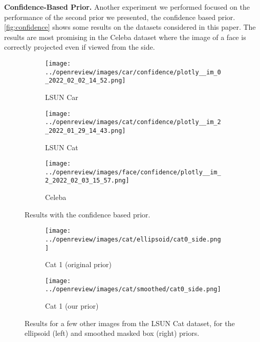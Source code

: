 \textbf{Confidence-Based Prior.}
Another experiment we performed focused on the performance of the second prior we presented, the confidence based prior. \autoref{fig:confidence} shows some results on the datasets considered in this paper. The results are most promising in the Celeba dataset where the image of a face is correctly projected even if viewed from the side.
\begin{figure}[!htb]
    \centering
    \begin{subfigure}{0.32\textwidth}
        \centering
        \texttt{[image: ../openreview/images/car/confidence/plotly\_\_im\_0\_2022\_02\_02\_14\_52.png]}
        \caption{LSUN Car}
        
    \end{subfigure}
    \begin{subfigure}{0.32\textwidth}
        \centering
        \texttt{[image: ../openreview/images/cat/confidence/plotly\_\_im\_2\_2022\_01\_29\_14\_43.png]}
        \caption{LSUN Cat}
        
    \end{subfigure}
    \begin{subfigure}{0.32\textwidth}
        \centering
        \texttt{[image: ../openreview/images/face/confidence/plotly\_\_im\_2\_2022\_02\_03\_15\_57.png]}
        \caption{Celeba}
        
    \end{subfigure}
    \caption{Results with the confidence based prior.}
    \label{fig:confidence}
\end{figure}

\begin{figure}[!htb]
    \centering
    \begin{subfigure}{0.4\textwidth}
        \centering
        \texttt{[image: ../openreview/images/cat/ellipsoid/cat0\_side.png]}
        \caption{Cat 1 (original prior)}
    \end{subfigure}
    \begin{subfigure}{0.4\textwidth}
        \centering
        \texttt{[image: ../openreview/images/cat/smoothed/cat0\_side.png]}
        \caption{Cat 1 (our prior)}
    \end{subfigure}
    \caption{Results for a few other images from the LSUN Cat dataset, for the ellipsoid (left) and smoothed masked box (right) priors.}
    \label{fig:appendix-ellips_vs_box}
\end{figure}

\newpage

